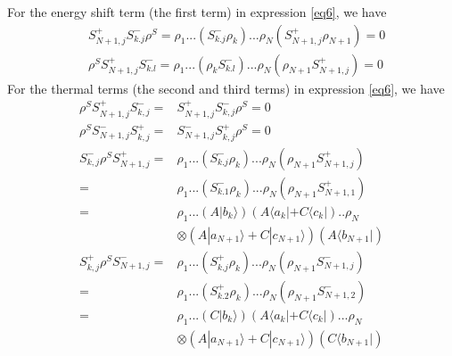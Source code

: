 \documentclass[aps,showpacs,twocolumn,twoside,groupedaddress]{revtex4}
\begin{document}
For the energy shift term (the first term) in expression \eqref{eq6}, we have 
\begin{equation}
\label{eq7}
\begin{split}
&S_{N+1,j}^{+}S_{k.j}^{-}\rho^{S}=\rho_{1}...(S_{k.j}^{-}\rho_{k})...\rho_{N}(S_{N+1,j}^{+}\rho_{N+1})=0\\
&\rho^{S}S_{N+1,j}^{+}S_{k.l}^{-}=\rho_{1}...(\rho_{k}S_{k.l}^{-})...\rho_{N}(\rho_{N+1}S_{N+1,j}^{+})=0
\end{split}
\end{equation}
For the thermal terms (the second and third terms) in expression \eqref{eq6}, we have
\begin{equation}
\label{eq8}
\begin{split}
\rho^{S}S_{N+1,j}^{+}S_{k,j}^{-}=&S_{N+1,j}^{+}S_{k,j}^{-}\rho^{S}=0\\
\rho^{S}S_{N+1,j}^{-}S_{k,j}^{+}=&S_{N+1,j}^{-}S_{k,j}^{+}\rho^{S}=0\\
S_{k,j}^{-}\rho^{S}S_{N+1,j}^{+}=&\rho_{1}...(S_{k.j}^{-}\rho_{k})...\rho_{N}(\rho_{N+1}S_{N+1,j}^{+})\\
=&\rho_{1}...(S_{k.1}^{-}\rho_{k})...\rho_{N}(\rho_{N+1}S_{N+1,1}^{+})\\
=&\rho_{1}...(A|b_{k}\rangle)(A\langle a_{k}|+C\langle c_{k}|)..\rho_{N}\\ 
  &\otimes(A|a_{N+1}\rangle+C|c_{N+1}\rangle)(A\langle b_{N+1}|)\\
S_{k,j}^{+}\rho^{S}S_{N+1,j}^{-}=&\rho_{1}...(S_{k.j}^{+}\rho_{k})...\rho_{N}(\rho_{N+1}S_{N+1,j}^{-})\\
=&\rho_{1}...(S_{k.2}^{+}\rho_{k})...\rho_{N}(\rho_{N+1}S_{N+1,2}^{-})\\
=&\rho_{1}...(C|b_{k}\rangle)(A\langle a_{k}|+C\langle c_{k}|)...\rho_{N}\\
&\otimes (A|a_{N+1}\rangle+C|c_{N+1}\rangle)(C\langle b_{N+1}|)
\end{split}
\end{equation}
\end{document}
